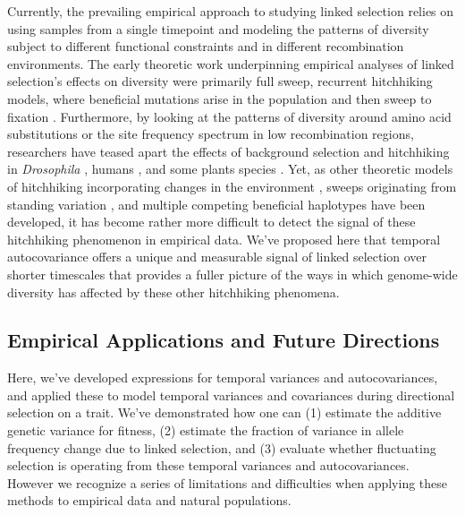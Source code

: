 \documentclass[11pt]{article}
\begin{document}
Currently, the prevailing empirical approach to studying linked selection
relies on using samples from a single timepoint and modeling the patterns of
diversity subject to different functional constraints and in different
recombination environments. The early theoretic work underpinning empirical
analyses of linked selection's effects on diversity were primarily full sweep,
recurrent hitchhiking models, where beneficial mutations arise in the
population and then sweep to fixation
\parencite{Maynard_Smith1974-lc,Stephan1992-jc,Kaplan1989-ld}. Furthermore, by
looking at the patterns of diversity around amino acid substitutions or the
site frequency spectrum in low recombination regions, researchers have teased
apart the effects of background selection and hitchhiking in \emph{Drosophila}
\parencite{Begun2007-bg,Elyashiv2016-vt}, humans
\parencite{Hernandez2011-gs,McVicker2009-ax}, and some plants species
\parencite{Nordborg2005-vt,Beissinger2016-cm,Schmid2005-on,Williamson2014-oy}.
Yet, as other theoretic models of hitchhiking incorporating changes in the
environment \parencite{Kopp2007-mc,Kopp2009-lo,Kopp2009-pj}, sweeps originating
from standing variation \parencite{Hermisson2005-hs}, and multiple competing
beneficial haplotypes \parencite{Pennings2006-lj} have been developed, it has
become rather more difficult to detect the signal of these hitchhiking
phenomenon in empirical data. We've proposed here that temporal autocovariance
offers a unique and measurable signal of linked selection over shorter
timescales that provides a fuller picture of the ways in which genome-wide
diversity has affected by these other hitchhiking phenomena. 

\subsection{Empirical Applications and Future Directions}

Here, we've developed expressions for temporal variances and autocovariances,
and applied these to model temporal variances and covariances during
directional selection on a trait. We've demonstrated how one can (1) estimate
the additive genetic variance for fitness, (2) estimate the fraction of
variance in allele frequency change due to linked selection, and (3) evaluate
whether fluctuating selection is operating from these temporal variances and
autocovariances. However we recognize a series of limitations and difficulties
when applying these methods to empirical data and natural populations.
\end{document}
